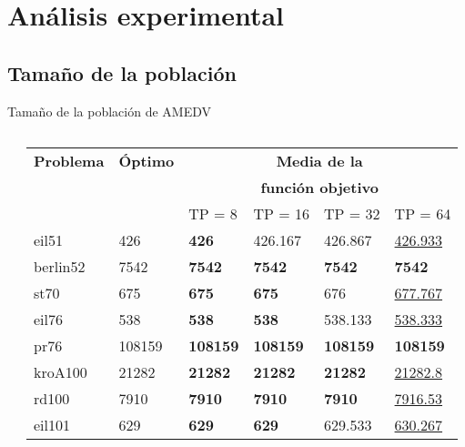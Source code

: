 
\section{Análisis experimental}

	\subsection*{Tamaño de la población}

		\begin{frame}{Tamaño de la población de AMEDV}
			\fontsize{6}{7.5}\selectfont					
			\kern -0.25cm
			\begin{columns}[c]
				\begin{table}
					\label{table:tp}
					\centering
					\begin{tabular}{llllll}
						\toprule
						\textbf{Problema} & \textbf{Óptimo} & \multicolumn{4}{c}{\color{red}\textbf{Media de la}} \\
						 &  & \multicolumn{4}{c}{\color{red}\textbf{función objetivo}} \\
						\midrule 
						& & TP = 8 & TP = 16 & TP = 32 & TP = 64 \\
						\cmidrule{3-6}
						eil51    & 426    & \textbf{426} & 426.167 & 426.867 & \underline{426.933} \\
						berlin52 & 7542   & \textbf{7542} & \textbf{7542} & \textbf{7542} & \textbf{7542} \\
						st70     & 675    & \textbf{675} & \textbf{675} & 676 & \underline{677.767} \\
						eil76    & 538    & \textbf{538} & \textbf{538} & 538.133 & \underline{538.333} \\
						pr76     & 108159 & \textbf{108159} & \textbf{108159} & \textbf{108159} & \textbf{108159} \\
						kroA100  & 21282  & \textbf{21282} & \textbf{21282} & \textbf{21282} & \underline{21282.8} \\
						rd100    & 7910   & \textbf{7910} & \textbf{7910} & \textbf{7910} & \underline{7916.53} \\
						eil101   & 629    & \textbf{629} & \textbf{629} & 629.533 & \underline{630.267} \\

\end{tabular}
\end{table}
\end{columns}
\end{frame}
